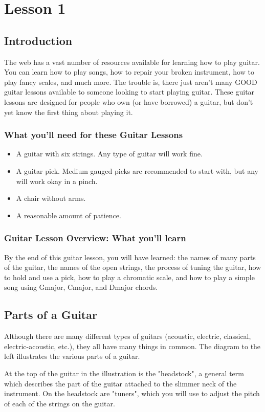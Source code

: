 \chapter{Lesson 1}
\section{Introduction}
The web has a vast number of resources available for learning how to play
guitar. You can learn how to play songs, how to repair your broken instrument,
how to play fancy scales, and much more. The trouble is, there just aren't many
GOOD guitar lessons available to someone looking to start playing guitar. These
guitar lessons are designed for people who own (or have borrowed) a guitar, but
don't yet know the first thing about playing it.

\subsection{What you'll need for these Guitar Lessons}
%
\begin{itemize}
\item A guitar with six strings. Any type of guitar will work fine.
\item A guitar pick. Medium gauged picks are recommended to start with, but any
      will work okay in a pinch.
\item A chair without arms.
\item A reasonable amount of patience.
\end{itemize}
%
\subsection{Guitar Lesson Overview: What you'll learn}
By the end of this guitar lesson, you will have learned: the names of many
parts of the guitar, the names of the open strings, the process of tuning the
guitar, how to hold and use a pick, how to play a chromatic scale, and how to
play a simple song using Gmajor, Cmajor, and Dmajor chords. 

\section{Parts of a Guitar}
Although there are many different types of guitars (acoustic, electric,
classical, electric-acoustic, etc.), they all have many things in common. The
diagram to the left illustrates the various parts of a guitar.

At the top of the guitar in the illustration is the "headstock", a general term
which describes the part of the guitar attached to the slimmer neck of the
instrument. On the headstock are "tuners", which you will use to adjust the
pitch of each of the strings on the guitar.


